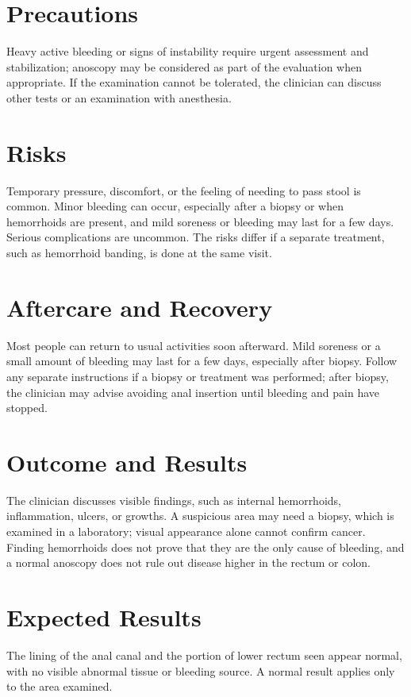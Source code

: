 \section*{Precautions}
Heavy active bleeding or signs of instability require urgent assessment and stabilization; anoscopy may be considered as part of the evaluation when appropriate. If the examination cannot be tolerated, the clinician can discuss other tests or an examination with anesthesia.

\section*{Risks}
Temporary pressure, discomfort, or the feeling of needing to pass stool is common. Minor bleeding can occur, especially after a biopsy or when hemorrhoids are present, and mild soreness or bleeding may last for a few days. Serious complications are uncommon. The risks differ if a separate treatment, such as hemorrhoid banding, is done at the same visit.

\section*{Aftercare and Recovery}
Most people can return to usual activities soon afterward. Mild soreness or a small amount of bleeding may last for a few days, especially after biopsy. Follow any separate instructions if a biopsy or treatment was performed; after biopsy, the clinician may advise avoiding anal insertion until bleeding and pain have stopped.

\section*{Outcome and Results}
The clinician discusses visible findings, such as internal hemorrhoids, inflammation, ulcers, or growths. A suspicious area may need a biopsy, which is examined in a laboratory; visual appearance alone cannot confirm cancer. Finding hemorrhoids does not prove that they are the only cause of bleeding, and a normal anoscopy does not rule out disease higher in the rectum or colon.

\section*{Expected Results}
The lining of the anal canal and the portion of lower rectum seen appear normal, with no visible abnormal tissue or bleeding source. A normal result applies only to the area examined.

